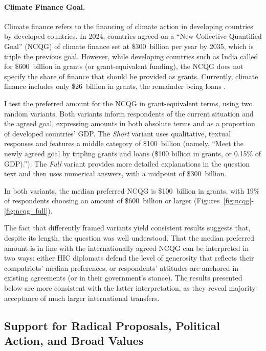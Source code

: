 \documentclass[12pt,english]{article}
\begin{document}
\paragraph{Climate Finance Goal.}\label{par:ncqg}

Climate finance refers to the financing of climate action in developing countries by developed countries. In 2024, countries agreed on a ``New Collective Quantified Goal'' (NCQG) of climate finance set at \$300~billion per year by 2035, which is triple the previous goal. However, while developing countries such as India called for \$600~billion in grants (or grant-equivalent funding), the NCQG does not specify the share of finance that should be provided as grants. Currently, climate finance includes only \$26~billion in grants, the remainder being loans \citep{oecd_climate_2024}. 

I test the preferred amount for the NCQG in grant-equivalent terms, using two random variants. Both variants inform respondents of the current situation and the agreed goal, expressing amounts in both absolute terms and as a proportion of developed countries' GDP. The \textit{Short} variant uses qualitative, textual responses and features a middle category of \$100~billion (namely, ``Meet the newly agreed goal by tripling grants and loans (\$100 billion in grants, or 0.15\% of GDP).''). The \textit{Full} variant provides more detailed explanations in the question text and then uses numerical answers, with a midpoint of \$300~billion. 

In both variants, the median preferred NCQG is \$100~billion in grants, with 19\% of respondents choosing an amount of \$600~billion or larger (Figures~\ref{fig:ncqg}-\ref{fig:ncqg_full}). 

The fact that differently framed variants yield consistent results suggests that, despite its length, the question was well understood. 
That the median preferred amount is in line with the internationally agreed NCQG can be interpreted in two ways: either HIC diplomats defend the level of generosity that reflects their compatriots' median preferences, or respondents' attitudes are anchored in existing agreements (or in their government's stance). The results presented below are more consistent with the latter interpretation, as they reveal majority acceptance of much larger international transfers.


\subsection{Support for Radical Proposals, Political Action, and Broad Values}\label{subsec:radical}
\end{document}
